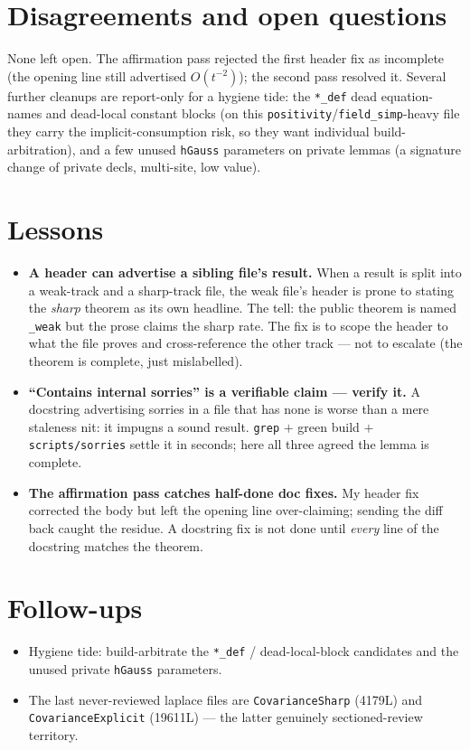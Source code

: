 \documentclass[11pt]{article}
\begin{document}
\section{Disagreements and open questions}
None left open. The affirmation pass rejected the first header fix as incomplete (the opening line
still advertised $O(t^{-2})$); the second pass resolved it. Several further cleanups are report-only
for a hygiene tide: the \texttt{*\_def} dead equation-names and dead-local constant blocks (on this
\texttt{positivity}/\texttt{field\_simp}-heavy file they carry the implicit-consumption risk, so they
want individual build-arbitration), and a few unused \texttt{hGauss} parameters on private lemmas
(a signature change of private decls, multi-site, low value).

\section{Lessons}
\begin{itemize}[noitemsep]
  \item \textbf{A header can advertise a sibling file's result.} When a result is split into a
    weak-track and a sharp-track file, the weak file's header is prone to stating the \emph{sharp}
    theorem as its own headline. The tell: the public theorem is named \texttt{\_weak} but the prose
    claims the sharp rate. The fix is to scope the header to what the file proves and cross-reference
    the other track --- not to escalate (the theorem is complete, just mislabelled).
  \item \textbf{``Contains internal sorries'' is a verifiable claim --- verify it.} A docstring
    advertising sorries in a file that has none is worse than a mere staleness nit: it impugns a sound
    result. \texttt{grep} $+$ green build $+$ \texttt{scripts/sorries} settle it in seconds; here all
    three agreed the lemma is complete.
  \item \textbf{The affirmation pass catches half-done doc fixes.} My header fix corrected the body but
    left the opening line over-claiming; sending the diff back caught the residue. A docstring fix is
    not done until \emph{every} line of the docstring matches the theorem.
\end{itemize}

\section{Follow-ups}
\begin{itemize}[noitemsep]
  \item Hygiene tide: build-arbitrate the \texttt{*\_def} / dead-local-block candidates and the unused
    private \texttt{hGauss} parameters.
  \item The last never-reviewed laplace files are \texttt{CovarianceSharp} (4179L) and
    \texttt{CovarianceExplicit} (19611L) --- the latter genuinely sectioned-review territory.
\end{itemize}
\end{document}
